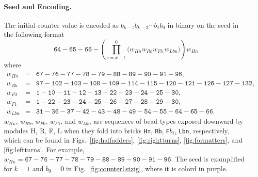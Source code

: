 \documentclass[twocolumn]{svjour3}
\begin{document}
\paragraph{Seed and Encoding.}
The initial counter value is encoded as $b_{k-1}b_{k-2} \cdots b_1b_0$ in binary on the seed in the following format
\begin{equation} \label{eq:zagencoding}
\texttt{64}{-}\texttt{65}{-}\texttt{66}{-}\left( \prod^0_{i = k-1} \bigl(  w_{Hn} w_{Rb} w_{Fb_i} w_{Lbn} \bigr) \right) w_{Hn}
\end{equation}
where 
\begin{eqnarray*}
w_{Hn} &=& \texttt{67}{-}\texttt{76}{-}\texttt{77}{-}\texttt{78}{-}\texttt{79}{-}\texttt{88}{-}\texttt{89}{-}\texttt{90}{-}\texttt{91}{-}\texttt{96},\\
w_{Rb} &=& \texttt{97}{-}\texttt{102}{-}\texttt{103}{-}\texttt{108}{-}\texttt{109}{-}\texttt{114}{-}\texttt{115}{-}\texttt{120}{-}\texttt{121}{-}\texttt{126}{-}\texttt{127}{-}\texttt{132},\\
w_{F0} &=& \texttt{1}{-}\texttt{10}{-}\texttt{11}{-}\texttt{12}{-}\texttt{13}{-}\texttt{22}{-}\texttt{23}{-}\texttt{24}{-}\texttt{25}{-}\texttt{30},\\
w_{F1} &=& \texttt{1}{-}\texttt{22}{-}\texttt{23}{-}\texttt{24}{-}\texttt{25}{-}\texttt{26}{-}\texttt{27}{-}\texttt{28}{-}\texttt{29}{-}\texttt{30},\\
 w_{Lbn} &=& \texttt{31}{-}\texttt{36}{-}\texttt{37}{-}\texttt{42}{-}\texttt{43}{-}\texttt{48}{-}\texttt{49}{-}\texttt{54}{-}\texttt{55}{-}\texttt{64}{-}\texttt{65}{-}\texttt{66}.
\end{eqnarray*}
$w_{Hn}$, $w_{Rb}$, $w_{F0}$, $w_{F1}$, and $w_{Lbn}$ are sequences of bead types exposed downward by modules H, R, F, L when they fold into bricks \texttt{Hn}, \texttt{Rb}, \texttt{F}$b_i$, \texttt{Lbn}, respectively, which can be found in Figs.~\ref{fig:halfadders}, \ref{fig:rightturns}, \ref{fig:formatters}, and \ref{fig:leftturns}.
For example, $w_{Hn} = \texttt{67}{-}\texttt{76}{-}\texttt{77}{-}\texttt{78}{-}\texttt{79}{-}\texttt{88}{-}\texttt{89}{-}\texttt{90}{-}\texttt{91}{-}\texttt{96}$.
The seed is examplified for $k = 1$ and $b_0 = 0$ in Fig.~\ref{fig:counter1stzig}, where it is colord in purple.
\end{document}
